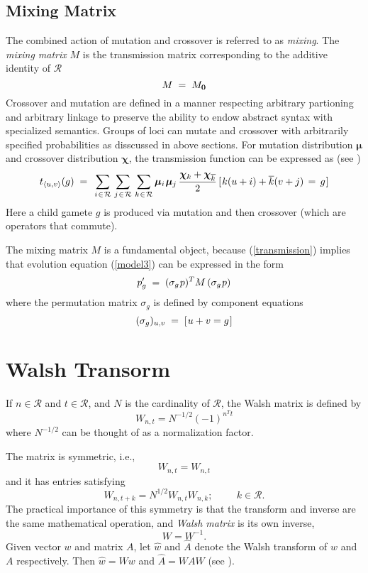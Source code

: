 \subsection{Mixing Matrix}
The combined action of mutation and crossover is referred to as {\em mixing}.
The {\em mixing matrix\/} $M$ is the transmission matrix corresponding to the 
additive identity of $\mathcal{R}$
\[
M \; = \; M_{\bf 0}\\[-0.01in]
\]
Crossover and mutation are defined in a manner respecting arbitrary partioning and 
arbitrary linkage to preserve the ability to endow abstract syntax with specialized 
semantics. Groups of loci can mutate and crossover with arbitrarily specified 
probabilities as disscussed in above sections. For mutation distribution $\bm{\mu}$ and 
crossover distribution $\bm{\chi}$, the transmission function can be expressed as (see \cite{VoseWright1998})
\begin{equation}
\label{transmission}
t_{\langle u,v \rangle}(g) \; = \;\,
\sum_{i \hspace{0.01in} \in \hspace{0.01in} \mathcal{R}} \, \sum_{j \hspace{0.01in} \in \hspace{0.01in} \mathcal{R}} \,
\sum_{k \hspace{0.01in} \in \hspace{0.01in} \mathcal{R}}
\bm{\mu}_i \hspace{0.01in} \bm{\mu}_j \, \frac{\bm{\chi}_k + \bm{\chi}_{\overline{k}}}{2} \,
[\hspace{0.01in} k (u + i) + \overline{k}(v + j) \, = \, g\hspace{0.01in}]
\end{equation}
Here a child gamete $g$ is produced via mutation and then crossover (which are operators that
commute). 

The mixing matrix $M$ is a fundamental object, because (\ref{transmission}) implies that 
evolution equation (\ref{model3}) can be expressed in the form
\begin{equation}
\label{model4}
p_g^\prime \; = \; (\sigma_g \hspace{0.01in} p)^T M \, (\sigma_g \hspace{0.01in} p)
\end{equation}
where the permutation matrix $\sigma_g$ is defined by component equations
\[
(\sigma_g)_{u,v} \; = \; [\hspace{0.01in} u+v = g\hspace{0.01in} ]
\]

\section{Walsh Transorm}
If $n \in \mathcal{R}$ and $t \in \mathcal{R}$, and $N$ is the cardinality of $\mathcal{R}$, 
the Walsh matrix is defined by
\begin{equation}
\label{WalshT}
W_{n,t} = N^{-1/2} (-1)^{n^T t}
\end{equation}
where $N^{-1/2}$ can be thought of as a normalization factor.

The matrix is symmetric, i.e.,
\[
W_{n,t} = W_{n,t}
\]
and it has entries satisfying
\[
W_{n, t + k} = N^{1/2} W_{n, t} W_{n, k}  ;  \hspace{1cm}  k \in \mathcal{R}.
\]
The practical importance of this symmetry is that the transform and inverse 
are the same mathematical operation, and \textit{Walsh matrix} is its own inverse,
\[
W = W^{-1}.
\]
Given vector $w$ and matrix $A$, let $\widehat{w}$ and
$\widehat{A}$ denote the Walsh transform of $w$ and $A$ respectively. Then $\widehat{w} = Ww$ and
$\widehat{A} = WAW$ (see \cite{Beauchamp1975}).

